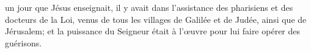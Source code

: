 \encetemps un jour que Jésus enseignait,
	il y avait dans l’assistance des pharisiens et des docteurs de la Loi,
	venus de tous les villages de Galilée et de Judée, ainsi que de Jérusalem;
	et la puissance du Seigneur était à l’œuvre
		pour lui faire opérer des guérisons.
